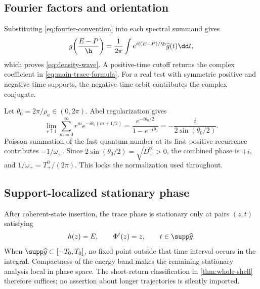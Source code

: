 \subsection{Fourier factors and orientation}

Substituting \cref{eq:fourier-convention} into each spectral summand gives
\begin{equation}
 g\!\left(\frac{E-P}{\h}\right)
 =\frac{1}{2\pi}\int
 e^{it(E-P)/\h}\widehat g(t)\dd t,
 \label{eq:functional-fourier}
\end{equation}
which proves \cref{eq:density-wave}.  A positive-time cutoff returns the
complex coefficient in \cref{eq:main-trace-formula}.  For a real test with
symmetric positive and negative time supports, the negative-time orbit
contributes the complex conjugate.

Let \(\theta_0=2\pi/\rho_a\in(0,2\pi)\).  Abel regularization gives
\begin{equation}
 \lim_{r\uparrow1}\sum_{m=0}^\infty
 r^m e^{-i\theta_0(m+1/2)}
 =\frac{e^{-i\theta_0/2}}{1-e^{-i\theta_0}}
 =-\frac{i}{2\sin(\theta_0/2)}.
 \label{eq:abel-transverse}
\end{equation}
Poisson summation of the fast quantum number at its first positive recurrence
contributes \(-1/\omega_+\).  Since
\(2\sin(\theta_0/2)=\sqrt{D_+^0}>0\), the combined phase is \(+i\), and
\(1/\omega_+=T_+^0/(2\pi)\).  This locks the normalization used throughout.

\subsection{Support-localized stationary phase}

After coherent-state insertion, the trace phase is stationary only at pairs
\((z,t)\) satisfying
\begin{equation}
 h(z)=E,
 \qquad \Phi^t(z)=z,
 \qquad t\in\supp\widehat g.
 \label{eq:stationary-set}
\end{equation}
When \(\supp\widehat g\subset[-T_0,T_0]\), no fixed point outside that time
interval occurs in the integral.  Compactness of the energy band makes the
remaining stationary analysis local in phase space.  The short-return
classification in \cref{thm:whole-shell} therefore suffices; no assertion
about longer trajectories is silently imported.
